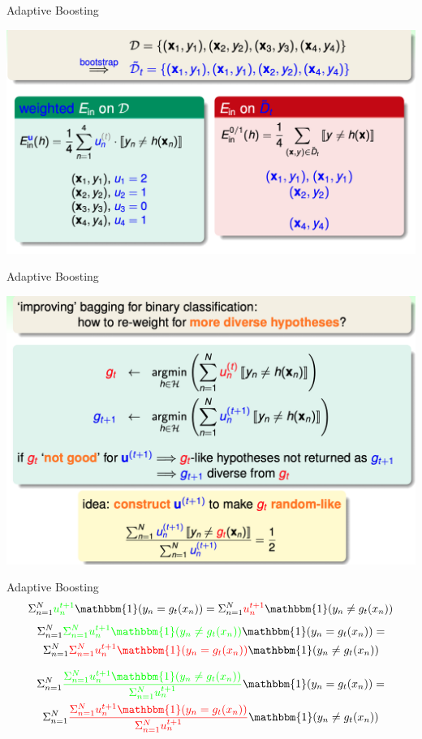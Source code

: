 \documentclass[
  ignorenonframetext,
]{beamer}
\begin{document}
\begin{frame}{Adaptive Boosting}
\begin{center}
  \includegraphics{figure/pdf/boost1.png}
\end{center}
\end{frame}


\begin{frame}{Adaptive Boosting}
\begin{center}
  \includegraphics{figure/pdf/boost2.png}
\end{center}
\end{frame}


\begin{frame}{Adaptive Boosting}
$$
\Sigma_{n=1}^N \textcolor{green}{u_n^{t+1}}\mathbbm{1}(y_n = g_t(x_n)) = \Sigma_{n=1}^N \textcolor{red}{u_n^{t+1}}\mathbbm{1}(y_n \neq g_t(x_n))
$$
\begin{multline*}
  \Sigma_{n=1}^N \textcolor{green}{\Sigma_{n=1}^N u_n^{t+1}\mathbbm{1}(y_n \neq g_t(x_n))} \mathbbm{1}(y_n = g_t(x_n)) =  \\
  \Sigma_{n=1}^N \textcolor{red}{\Sigma_{n=1}^N u_n^{t+1}\mathbbm{1}(y_n = g_t(x_n))} \mathbbm{1}(y_n \neq g_t(x_n))
\end{multline*}

\begin{multline*}
  \Sigma_{n=1}^N \textcolor{green}{\frac{\Sigma_{n=1}^N u_n^{t+1}\mathbbm{1}(y_n \neq g_t(x_n))}{\Sigma_{n=1}^N u_n^{t+1}}} \mathbbm{1}(y_n = g_t(x_n)) =  \\
  \Sigma_{n=1}^N  \textcolor{red}{\frac{\Sigma_{n=1}^N u_n^{t+1}\mathbbm{1}(y_n = g_t(x_n))}{\Sigma_{n=1}^N u_n^{t+1}}} \mathbbm{1}(y_n \neq g_t(x_n))
\end{multline*}
\end{frame}
\end{document}
